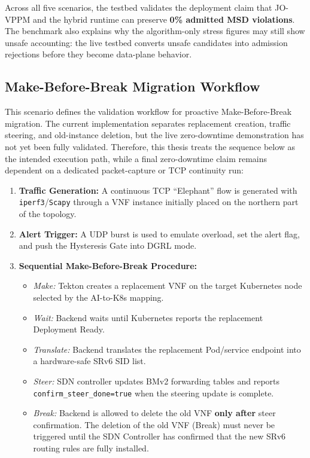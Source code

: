 \documentclass[12pt, a4paper, reqno, oneside]{book}
\begin{document}
Across all five scenarios, the testbed validates the deployment claim that JO-VPPM and the hybrid runtime can preserve \textbf{0\% admitted MSD violations}. The benchmark also explains why the algorithm-only stress figures may still show unsafe accounting: the live testbed converts unsafe candidates into admission rejections before they become data-plane behavior.

\subsection{Make-Before-Break Migration Workflow}
This scenario defines the validation workflow for proactive Make-Before-Break migration. The current implementation separates replacement creation, traffic steering, and old-instance deletion, but the live zero-downtime demonstration has not yet been fully validated. Therefore, this thesis treats the sequence below as the intended execution path, while a final zero-downtime claim remains dependent on a dedicated packet-capture or TCP continuity run:
\begin{enumerate}
    \item \textbf{Traffic Generation:} A continuous TCP ``Elephant'' flow is generated with \texttt{iperf3}/\texttt{Scapy} through a VNF instance initially placed on the northern part of the topology.
    \item \textbf{Alert Trigger:} A UDP burst is used to emulate overload, set the alert flag, and push the Hysteresis Gate into DGRL mode.
    \item \textbf{Sequential Make-Before-Break Procedure:}
    \begin{itemize}
        \item \textit{Make:} Tekton creates a replacement VNF on the target Kubernetes node selected by the AI-to-K8s mapping.
        \item \textit{Wait:} Backend waits until Kubernetes reports the replacement Deployment Ready.
        \item \textit{Translate:} Backend translates the replacement Pod/service endpoint into a hardware-safe SRv6 SID list.
        \item \textit{Steer:} SDN controller updates BMv2 forwarding tables and reports \texttt{confirm\_steer\_done=true} when the steering update is complete.
        \item \textit{Break:} Backend is allowed to delete the old VNF \textbf{only after} steer confirmation. The deletion of the old VNF (Break) must never be triggered until the SDN Controller has confirmed that the new SRv6 routing rules are fully installed.
    \end{itemize}
\end{enumerate}
\end{document}

